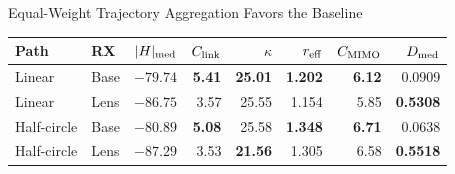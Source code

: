 \begin{frame}[t]{Equal-Weight Trajectory Aggregation Favors the Baseline}
\scriptsize
\centering
\renewcommand{\arraystretch}{1.18}
\begin{tabular}{@{}llrrrrrr@{}}
  \toprule
  Path & RX & $|H|_{\rm med}$ & $C_{\rm link}$ & $\kappa$ & $r_{\rm eff}$ & $C_{\rm MIMO}$ & $D_{\rm med}$\\
  \midrule
  Linear & Base & $-79.74$ & \textbf{5.41} & \textbf{25.01} & \textbf{1.202} & \textbf{6.12} & 0.0909\\
  Linear & Lens & $-86.75$ & 3.57 & 25.55 & 1.154 & 5.85 & \textbf{0.5308}\\
  Half-circle & Base & $-80.89$ & \textbf{5.08} & 25.58 & \textbf{1.348} & \textbf{6.71} & 0.0638\\
  Half-circle & Lens & $-87.29$ & 3.53 & \textbf{21.56} & 1.305 & 6.58 & \textbf{0.5518}\\
  \bottomrule
\end{tabular}


\end{frame}

